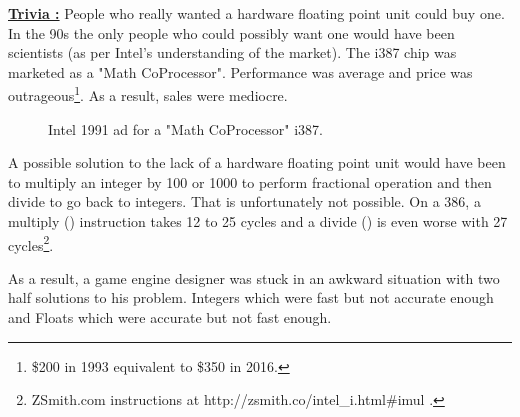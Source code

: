 \documentclass[book.tex]{subfiles}
\begin{document}
\textbf{\underline{Trivia :}} People who really wanted a hardware floating point unit could buy one. In the 90s the only people who could possibly want one would have been scientists (as per Intel's understanding of the market). The i387 chip was marketed as a "Math CoProcessor". Performance was average and price was outrageous\footnote{\$200 in 1993 equivalent to \$350 in 2016.}. As a result, sales were mediocre.\\
\begin{figure}[H]
\centering
  
  
\caption{Intel 1991 ad for a "Math CoProcessor" i387.}
\label{fig:fp_internals}
\end{figure}



\par
A possible solution to the lack of a hardware floating point unit would have been to multiply an integer by 100 or 1000 to perform fractional operation and then divide to go back to integers. That is unfortunately not possible. On a 386, a multiply () instruction takes 12 to 25 cycles and a divide () is even worse with 27 cycles\footnote{ZSmith.com instructions at http://zsmith.co/intel\_i.html\#imul .}.\\ 
\par
As a result, a game engine designer was stuck in an awkward situation with two half solutions to his problem. Integers which were fast but not accurate enough and Floats which were accurate but not fast enough.\\
\par
  
\end{document}
